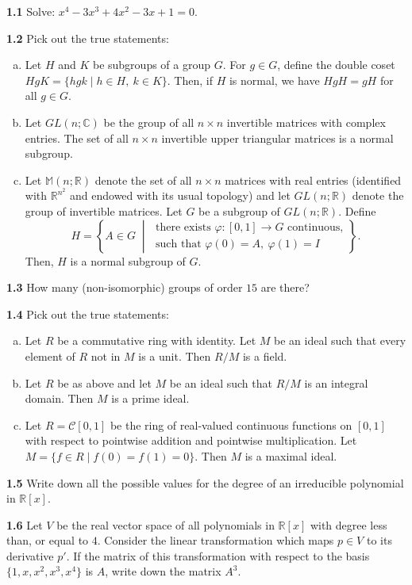 \documentclass[11pt,a4paper]{article}
\newcommand{\R}{\mathbb{R}}
\newcommand{\C}{\mathbb{C}}
\newcommand{\M}{\mathbb{M}}
\newcommand{\qitem}[1]{\par\medskip\noindent\textbf{#1}\hspace{0.5em}}
\begin{document}
\qitem{1.1} Solve: $x^4 - 3x^3 + 4x^2 - 3x + 1 = 0$.

\qitem{1.2} Pick out the true statements:
\begin{enumerate}[a.]
  \item Let $H$ and $K$ be subgroups of a group $G$. For $g \in G$, define the double coset $HgK = \{hgk \mid h \in H,\ k \in K\}$. Then, if $H$ is normal, we have $HgH = gH$ for all $g \in G$.
  \item Let $GL(n; \C)$ be the group of all $n \times n$ invertible matrices with complex entries. The set of all $n \times n$ invertible upper triangular matrices is a normal subgroup.
  \item Let $\M(n; \R)$ denote the set of all $n \times n$ matrices with real entries (identified with $\R^{n^2}$ and endowed with its usual topology) and let $GL(n; \R)$ denote the group of invertible matrices. Let $G$ be a subgroup of $GL(n; \R)$. Define
  \[
    H = \left\{A \in G \;\middle|\; \begin{array}{l}\text{there exists } \varphi : [0, 1] \to G \text{ continuous,}\\ \text{such that } \varphi(0) = A,\ \varphi(1) = I\end{array}\right\}.
  \]
  Then, $H$ is a normal subgroup of $G$.
\end{enumerate}

\qitem{1.3} How many (non-isomorphic) groups of order $15$ are there?

\qitem{1.4} Pick out the true statements:
\begin{enumerate}[a.]
  \item Let $R$ be a commutative ring with identity. Let $M$ be an ideal such that every element of $R$ not in $M$ is a unit. Then $R/M$ is a field.
  \item Let $R$ be as above and let $M$ be an ideal such that $R/M$ is an integral domain. Then $M$ is a prime ideal.
  \item Let $R = \mathcal{C}[0, 1]$ be the ring of real-valued continuous functions on $[0, 1]$ with respect to pointwise addition and pointwise multiplication. Let $M = \{f \in R \mid f(0) = f(1) = 0\}$. Then $M$ is a maximal ideal.
\end{enumerate}

\qitem{1.5} Write down all the possible values for the degree of an irreducible polynomial in $\R[x]$.

\qitem{1.6} Let $V$ be the real vector space of all polynomials in $\R[x]$ with degree less than, or equal to $4$. Consider the linear transformation which maps $p \in V$ to its derivative $p'$. If the matrix of this transformation with respect to the basis $\{1, x, x^2, x^3, x^4\}$ is $A$, write down the matrix $A^3$.
\end{document}
